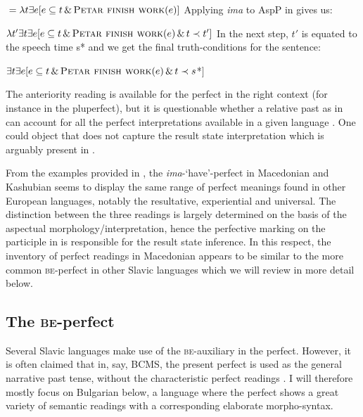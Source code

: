 \documentclass[output=paper,colorlinks,citecolor=brown]{langscibook}
\begin{document}
\ea \label{asp-ant-mac}
${}=\lambda t \exists  e[e \subseteq t \, \& \, \textsc{Petar finish work}(e)] $
\z
Applying {\textit{ima}} to AspP in  gives us:

\ea
$\lambda t' \exists  t \exists  e[e \subseteq t \, \& \, \textsc{Petar finish work}(e) \, \& \, t \prec t'] $
\z
In the next step, $t'$ is equated to the speech time s* and we get the final truth-conditions for the sentence:

\ea\label{tc-mac}
$\exists t \exists  e [e \subseteq t \, \& \, \textsc{Petar finish work}(e) \, \& \, t \prec s$*$]$
\z

\noindent The anteriority reading is  available for the perfect in the right context (for instance in the pluperfect), but it is questionable  whether a relative past as in   can account for all the perfect interpretations available in a given language \citep{gronn_stechow2020}.
One could object that  does not  capture the result state interpretation which is arguably present in . 

From the examples provided in \citet{Migdalski2006}, the  \textit{ima}-`have'-perfect in Macedonian and Kashubian seems to display the same range of perfect meanings found in other European languages, notably the resultative, experiential and universal. The distinction between the three readings is largely determined on the basis of  the aspectual morphology/interpretation, hence the perfective marking on the participle in 
 is responsible for the result state inference.
In this respect, the inventory of perfect readings in Macedonian appears to be similar to the more common {\textsc{be-}}perfect in other Slavic languages which we will review in more detail  below.





\subsection{The \textsc{be}-perfect} 

Several Slavic languages make use of the {\textsc{be}}-auxiliary in the perfect. However, it is often claimed that in, say, BCMS, the present perfect is used as the general narrative past 
tense, without the characteristic perfect readings 
\citep[47]{Migdalski2006}. I will therefore mostly focus on Bulgarian below, a language where the perfect shows a great variety of semantic readings with a corresponding elaborate morpho-syntax.
\end{document}

